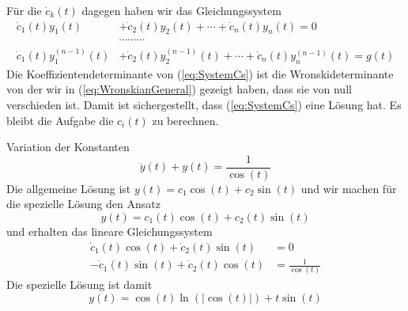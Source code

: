 Für die $\dot{c}_k(t)$ dagegen haben wir das Gleichungssystem
\begin{align}
  \dot{c}_1(t)y_1(t)&+\dot{c}_2(t)y_2(t)+\cdots+\dot{c}_n(t)y_n(t)=0\nonumber\\
	       &\cdots\cdots\cdots\nonumber\\
  \dot{c}_1(t)y^{(n-1)}_1(t)&+\dot{c}_2(t)y^{(n-1)}_2(t)+\cdots
  +\dot{c}_n(t)y^{(n-1)}_n(t)=g(t)
	       \label{eq:SystemCs}
\end{align}
Die Koeffizientendeterminante von (\ref{eq:SystemCs}) ist die
Wronskideterminante von der wir in (\ref{eq:WronskianGeneral}) gezeigt haben,
dass sie von null verschieden ist. Damit ist sichergestellt, dass
(\ref{eq:SystemCs}) eine Lösung hat. Es bleibt die Aufgabe die $c_i(t)$ zu berechnen.
%
\begin{example}{Variation der Konstanten}
  \[\ddot{y}(t)+y(t)=\frac{1}{\cos(t)}\]
  Die allgemeine Lösung ist $y(t)=c_1\cos(t)+c_2\sin(t)$ und wir machen für die
  spezielle Lösung den Ansatz
  \[y(t)=c_1(t)\cos(t)+c_2(t)\sin(t)\]
  und erhalten das lineare Gleichungssystem
  \begin{align*}
    \dot{c}_1(t)\cos(t)+\dot{c}_2(t)\sin(t)&=0\\
    -\dot{c}_1(t)\sin(t)+\dot{c}_2(t)\cos(t)&=\frac{1}{\cos(t)}
  \end{align*}
  Die spezielle Lösung ist damit
  \[y(t)=\cos(t)\ln(|\cos(t)|)+t\sin(t)\]
\end{example}
%
